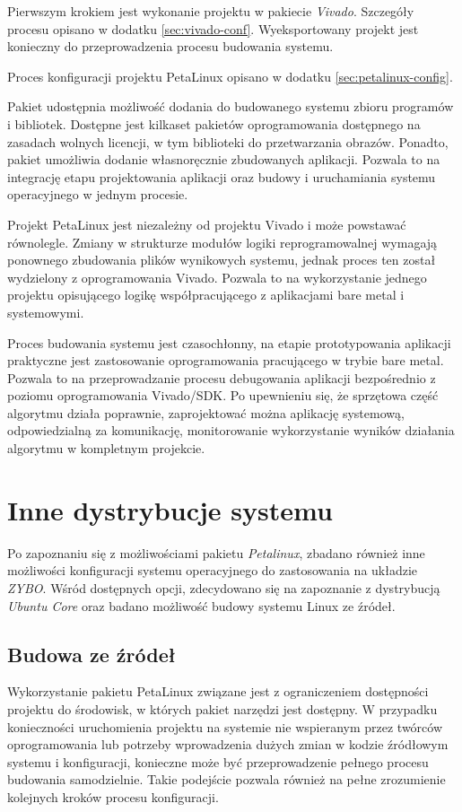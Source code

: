 Pierwszym krokiem jest wykonanie projektu w pakiecie \emph{Vivado}. Szczegóły procesu opisano w dodatku \ref{sec:vivado-conf}. Wyeksportowany projekt jest konieczny do przeprowadzenia procesu budowania systemu.

Proces konfiguracji projektu PetaLinux opisano w dodatku \ref{sec:petalinux-config}.

Pakiet udostępnia możliwość dodania do budowanego systemu zbioru programów i bibliotek. Dostępne jest kilkaset pakietów oprogramowania dostępnego na zasadach wolnych licencji, w tym biblioteki do przetwarzania obrazów. Ponadto, pakiet umożliwia dodanie własnoręcznie zbudowanych aplikacji. Pozwala to na integrację etapu projektowania aplikacji oraz budowy i uruchamiania systemu operacyjnego w jednym procesie.

Projekt PetaLinux jest niezależny od projektu Vivado i może powstawać równolegle. Zmiany w strukturze modułów logiki reprogramowalnej wymagają ponownego zbudowania plików wynikowych systemu, jednak proces ten został wydzielony z oprogramowania Vivado. Pozwala to na wykorzystanie jednego projektu opisującego logikę współpracującego z aplikacjami bare metal i systemowymi. 

Proces budowania systemu jest czasochłonny, na etapie prototypowania aplikacji praktyczne jest zastosowanie oprogramowania pracującego w trybie bare metal. Pozwala to na przeprowadzanie procesu debugowania aplikacji bezpośrednio z poziomu oprogramowania Vivado/SDK. Po upewnieniu się, że sprzętowa część algorytmu działa poprawnie, zaprojektować można aplikację systemową, odpowiedzialną za komunikację, monitorowanie wykorzystanie wyników działania algorytmu w kompletnym projekcie.

\section{Inne dystrybucje systemu}
Po zapoznaniu się z możliwościami pakietu \emph{Petalinux}, zbadano również inne możliwości konfiguracji systemu operacyjnego do zastosowania na układzie \emph{ZYBO}. Wśród dostępnych opcji, zdecydowano się na zapoznanie z dystrybucją \emph{Ubuntu Core} oraz badano możliwość budowy systemu Linux ze źródeł.

\subsection{Budowa ze źródeł}
Wykorzystanie pakietu PetaLinux związane jest z ograniczeniem dostępności projektu do środowisk, w których pakiet narzędzi jest dostępny. W przypadku konieczności uruchomienia projektu na systemie nie wspieranym przez twórców oprogramowania lub potrzeby wprowadzenia dużych zmian w kodzie źródłowym systemu i konfiguracji, konieczne może być przeprowadzenie pełnego procesu budowania samodzielnie. Takie podejście pozwala również na pełne zrozumienie kolejnych kroków procesu konfiguracji.


